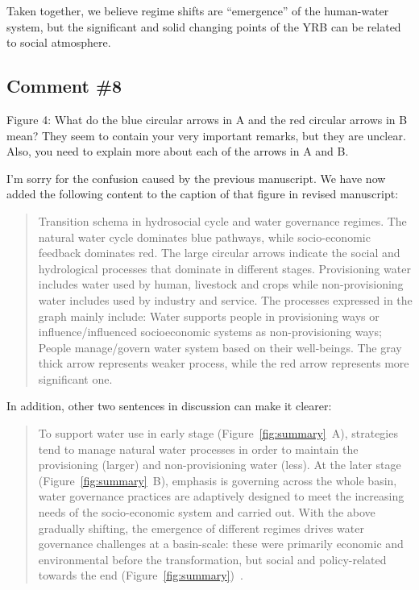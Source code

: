 \AR*{} Taken together, we believe regime shifts are ``emergence'' of the human-water system, but the significant and solid changing points of the YRB can be related to social atmosphere.

\subsection{Comment \#8}
\RC{} Figure 4: What do the blue circular arrows in A and the red circular arrows in B mean? They seem to contain your very important remarks, but they are unclear. Also, you need to explain more about each of the arrows in A and B.

\AR{} I'm sorry for the confusion caused by the previous manuscript. We have now added the following content to the caption of that figure in revised manuscript:

\begin{quote}
    Transition schema in hydrosocial cycle and water governance regimes. The natural water cycle dominates blue pathways, while socio-economic feedback dominates red.
    The large circular arrows indicate the social and hydrological processes that dominate in different stages.
    Provisioning water includes water used by human, livestock and crops while non-provisioning water includes used by industry and service.
    The processes expressed in the graph mainly include: Water supports people in provisioning ways or influence/influenced socioeconomic systems as non-provisioning ways; People manage/govern water system based on their well-beings.
    The gray thick arrow represents weaker process, while the red arrow represents more significant one.
\end{quote}

\AR*{} In addition, other two sentences in discussion can make it clearer:

\begin{quote}
    To support water use in early stage (Figure~\ref{fig:summary}~A), strategies tend to manage natural water processes in order to maintain the provisioning (larger) and non-provisioning water (less).
    At the later stage (Figure~\ref{fig:summary}~B), emphasis is governing across the whole basin, water governance practices are adaptively designed to meet the increasing needs of the socio-economic system and carried out.
    With the above gradually shifting, the emergence of different regimes drives water governance challenges at a basin-scale: these were primarily economic and environmental before the transformation, but social and policy-related towards the end (Figure~\ref{fig:summary})~\cite{singh2019,porcher2019}.
\end{quote}

